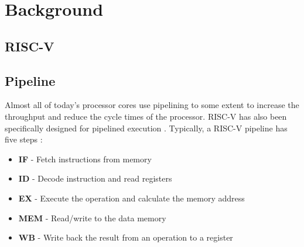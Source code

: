\chapter{Background}
\label{ch:Background} 

%
%
%

\section{RISC-V}


\section{Pipeline}
\label{sec:bg_pipeline}

Almost all of today's processor cores use pipelining to some extent to increase the throughput and reduce the cycle times of the processor. RISC-V has also been specifically designed for pipelined execution \cite{pattersonComputerOrganizationDesign2021}. 
Typically, a RISC-V pipeline has five steps \cite{pattersonComputerOrganizationDesign2021}:

\begin{itemize}
    \item \textbf{IF} - Fetch instructions from memory
    \item \textbf{ID} - Decode instruction and read registers
    \item \textbf{EX} - Execute the operation and calculate the memory address
    \item \textbf{MEM} - Read/write to the data memory
    \item \textbf{WB} - Write back the result from an operation to a register
\end{itemize}

